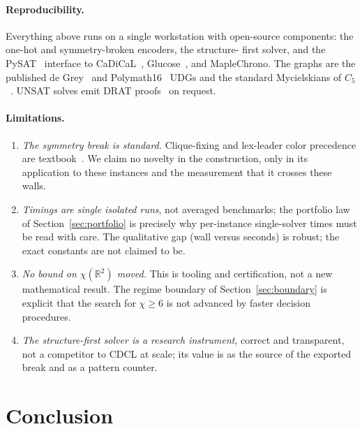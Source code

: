 \documentclass[11pt]{article}
\theoremstyle{definition}
\newcommand{\R}{\mathbb{R}}
\newcommand{\chrom}{\chi}
\begin{document}
\paragraph{Reproducibility.} Everything above runs on a single workstation with
open-source components: the one-hot and symmetry-broken encoders, the structure-
first solver, and the PySAT~\cite{IgnatievPySAT} interface to
CaDiCaL~\cite{BiereCadical}, Glucose~\cite{AudemardSimon2009}, and MapleChrono.
The graphs are the published de Grey~\cite{deGrey2018} and
Polymath16~\cite{Polymath16, Parts2020} UDGs and the standard Mycielskians of
$C_5$~\cite{Mycielski1955}. UNSAT solves emit DRAT
proofs~\cite{WetzlerHeuleHunt2014} on request.

\paragraph{Limitations.}
\begin{enumerate}
  \item \emph{The symmetry break is standard.} Clique-fixing and lex-leader color
        precedence are textbook~\cite{CrawfordSymmetry1996, SakallahSymmetry2009}.
        We claim no novelty in the construction, only in its application to these
        instances and the measurement that it crosses these walls.
  \item \emph{Timings are single isolated runs}, not averaged benchmarks; the
        portfolio law of Section~\ref{sec:portfolio} is precisely why per-instance
        single-solver times must be read with care. The qualitative gap (wall
        versus seconds) is robust; the exact constants are not claimed to be.
  \item \emph{No bound on $\chrom(\R^2)$ moved.} This is tooling and
        certification, not a new mathematical result. The regime boundary of
        Section~\ref{sec:boundary} is explicit that the search for $\chrom \ge 6$
        is not advanced by faster decision procedures.
  \item \emph{The structure-first solver is a research instrument}, correct and
        transparent, not a competitor to CDCL at scale; its value is as the source
        of the exported break and as a pattern counter.
\end{enumerate}

\section{Conclusion}
\label{sec:conclusion}
\end{document}

